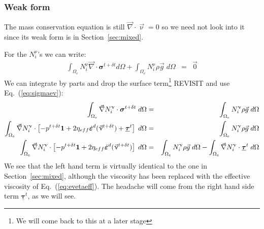 \subsubsection{Weak form}

The mass conservation equation is still $\vec\nabla\cdot\vec\upnu=0$ so we need not look into 
it since its weak form is in Section~\ref{sec:mixed}.

For the $N_i^\upnu$'s we can write:
\begin{eqnarray}
\int_{\Omega_e} N_i^\upnu {\vec \nabla}\cdot {\bm \sigma}^{t+\delta t} d\Omega 
+ \int_{\Omega_e} N_i^\upnu  \rho {\vec g} \; d\Omega 
&=& \vec 0 
\end{eqnarray}
We can integrate by parts and drop the surface term\footnote{We will come back to this at a later stage}
REVISIT and use Eq.~(\ref{eq:sigmaev}):
\begin{eqnarray}
\int_{\Omega_e} {\vec \nabla } N_i^\upnu \cdot {\bm \sigma}^{t+\delta t} \;  d\Omega 
&=& \int_{\Omega_e} N_i^\upnu  \rho {\vec g} \; d\Omega \nonumber\\ 
\int_{\Omega_e} {\vec \nabla } N_i^\upnu \cdot 
\left[ - p^{t+\delta t} {\bm 1} + 2 \eta_{eff} \dot{\bm \varepsilon}^d(\vec\upnu^{t+\delta t}) +
 \underline{\bm \tau}^{t}  \right] \;  d\Omega 
&=& \int_{\Omega_e} N_i^\upnu   \rho {\vec g}    \; d\Omega  \\
\int_{\Omega_e} {\vec \nabla } N_i^\upnu \cdot 
\left[ - p^{t+\delta t} {\bm 1} + 2 \eta_{eff} \dot{\bm \varepsilon}^d(\vec\upnu^{t+\delta t}) 
\right] \;  d\Omega 
&=& \int_{\Omega_e} N_i^\upnu   \rho {\vec g} \; d\Omega
- \int_{\Omega_e}  {\vec \nabla } N_i^\upnu \cdot \underline{\bm \tau}^{t}   \; d\Omega  
\end{eqnarray}
We see that the left hand term is virtually identical to the one in Section~\ref{sec:mixed}, although
the viscosity has been replaced with the effective viscosity of Eq.~(\ref{eq:evetaeff}).
The headache will come from the right hand side term $ \underline{\bm \tau}^{t}$, as we will see.

